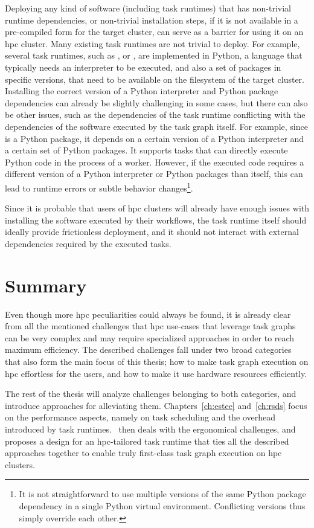 Deploying any kind of software (including task runtimes) that has non-trivial runtime dependencies,
or non-trivial installation steps, if it is not available in a pre-compiled form for the target
cluster, can serve as a barrier for using it on an \gls{hpc} cluster. Many
existing task runtimes are not trivial to deploy. For example, several task runtimes, such as
\dask{}, \snakemake{} or \pycompss{}, are
implemented in Python, a language that typically needs an interpreter to be executed, and also a
set of packages in specific versions, that need to be available on the filesystem of the target
cluster. Installing the correct version of a Python interpreter and Python package dependencies can
already be slightly challenging in some cases, but there can also be other issues, such as the
dependencies of the task runtime conflicting with the dependencies of the software executed by the
task graph itself. For example, since \dask{} is a Python package, it depends
on a certain version of a Python interpreter and a certain set of Python packages. It supports
tasks that can directly execute Python code in the process of a \dask{} worker.
However, if the executed code requires a different version of a Python interpreter or Python
packages than \dask{} itself, this can lead to runtime errors or subtle
behavior changes\footnote{It is not straightforward to use multiple versions of the same Python package dependency in a
single Python virtual environment. Conflicting versions thus simply override each other.}.

Since it is probable that users of \gls{hpc} clusters will already have enough
issues with installing the software executed by their workflows, the task runtime itself should
ideally provide frictionless deployment, and it should not interact with external dependencies
required by the executed tasks.

\section*{Summary}
Even though more \gls{hpc} peculiarities could always be found, it is already
clear from all the mentioned challenges that \gls{hpc} use-cases that leverage
task graphs can be very complex and may require specialized approaches in order to reach maximum
efficiency. The described challenges fall under two broad categories that also form the main focus
of this thesis; how to make task graph execution on \gls{hpc} effortless for the
users, and how to make it use hardware resources efficiently.

The rest of the thesis will analyze challenges belonging to both categories, and introduce
approaches for alleviating them. Chapters~\ref{ch:estee}
and~\ref{ch:rsds} focus on the performance aspects, namely on task scheduling and the
overhead introduced by task runtimes.~ then deals with the ergonomical
challenges, and proposes a design for an \gls{hpc}-tailored task runtime that
ties all the described approaches together to enable truly first-class task graph execution on
\gls{hpc} clusters.
